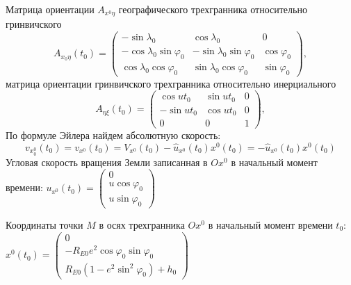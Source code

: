 \documentclass[a4paper,14pt]{article}
\theoremstyle{plain} %
\theoremstyle{definition} %
\theoremstyle{remark} %
\begin{document}
{Матрица ориентации $A_{x^0\eta}$ географического трехгранника относительно гринвичского
$$
    A_{x_{0} \eta}\left(t_{0}\right)=\left(\begin{array}{ccc}
            -\sin \lambda_{0}                  & \cos \lambda_{0}                   & 0                \\
            -\cos \lambda_{0} \sin \varphi_{0} & -\sin \lambda_{0} \sin \varphi_{0} & \cos \varphi_{0} \\
            \cos \lambda_{0} \cos \varphi_{0}  & \sin \lambda_{0} \cos \varphi_{0}  & \sin \varphi_{0}
        \end{array}\right),
$$
матрица ориентации гринвичского трехгранника относительно инерциального
$$
    A_{\eta \xi}\left(t_{0}\right)=\left(\begin{array}{ccc}
            \cos u t_{0}  & \sin u t_{0} & 0 \\
            -\sin u t_{0} & \cos u t_{0} & 0 \\
            0             & 0            & 1
        \end{array}\right),
$$
По формуле Эйлера найдем абсолютную скорость:
$$
    v_{x_{0}^{0}}\left(t_{0}\right)=v_{x^{0}}\left(t_{0}\right)=V_{x^{0}}\left(t_{0}\right)-\widehat{u}_{x^{0}}\left(t_{0}\right) x^{0}\left(t_{0}\right)=-\widehat{u}_{x^{0}}\left(t_{0}\right) x^{0}\left(t_{0}\right)
$$
Угловая скорость вращения Земли записанная в $Ox^{0}$ в начальный момент времени:
$u_{x^{0}}\left(t_{0}\right)=\left(\begin{array}{c}0 \\ u \cos \varphi_{0} \\ u \sin \varphi_{0}\end{array}\right)$

Координаты точки $M$ в осях трехгранника $Ox^0$ в начальный момент времени $t_0$:
$x^{0}\left(t_{0}\right)=\left(\begin{array}{c}0 \\ -R_{E 0} e^{2} \cos \varphi_{0} \sin \varphi_{0} \\ R_{E 0}\left(1-e^{2} \sin ^{2} \varphi_{0}\right)+h_{0}\end{array}\right)$

}
\end{document}
